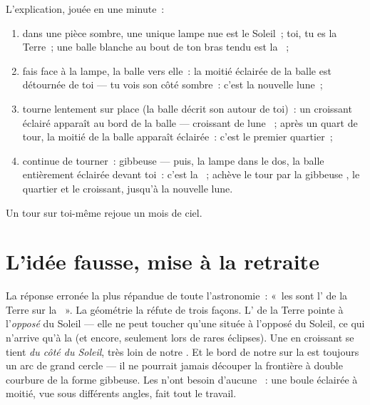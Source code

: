 \begin{method}\label{met:g7:moon-phases:walk}
L'explication, jouée en une minute~:
\begin{enumerate}
  \item dans une pièce sombre, une unique lampe nue est le Soleil~;
        toi, tu es la Terre~; une balle blanche au bout de ton bras
        tendu est la ~;
  \item fais face à la lampe, la balle vers elle~: la moitié
        éclairée de la balle est détournée de toi --- tu vois son
        côté sombre~: c'est la nouvelle lune~;
  \item tourne lentement sur place (la balle décrit son 
        autour de toi)~: un croissant éclairé apparaît au bord de la
        balle --- croissant de lune ~; après un quart de
        tour, la moitié de la balle apparaît éclairée~: c'est le
        premier quartier~;
  \item continue de tourner~: gibbeuse --- puis, la lampe dans le
        dos, la balle entièrement éclairée devant toi~: c'est la
        ~; achève le tour par la gibbeuse ,
        le quartier et le croissant, jusqu'à la nouvelle lune.
\end{enumerate}
Un tour sur toi-même rejoue un mois de ciel.
\end{method}

\section{L'idée fausse, mise à la retraite}

\begin{proposition}\label{prop:g7:moon-phases:notshadow}
La réponse erronée la plus répandue de toute l'astronomie~: «~les
 sont l' de la Terre sur la ~». La géométrie la réfute
de trois façons. L' de la Terre pointe à l'\emph{opposé} du
Soleil --- elle ne peut toucher qu'une  située à l'opposé du
Soleil, ce qui n'arrive qu'à la  (et encore, seulement
lors de rares éclipses). Une  en croissant se tient
\emph{du côté du Soleil}, très loin de notre . Et le bord de
notre  sur la  est toujours un arc de grand cercle --- il ne
pourrait jamais découper la frontière à double courbure de la forme
gibbeuse. Les  n'ont besoin d'aucune ~: une boule éclairée
à moitié, vue sous différents angles, fait tout le travail.
\end{proposition}

